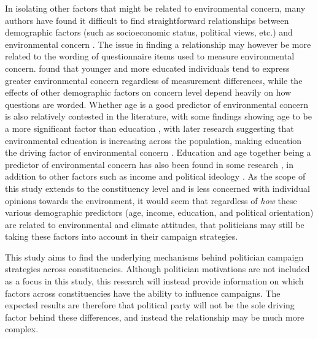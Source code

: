 \documentclass[12pt,letterpaper]{article}
\begin{document}
In isolating other factors that might be related to environmental concern, many authors have found it difficult to find straightforward relationships between demographic factors (such as socioeconomic status, political views, etc.) and environmental concern \autocite{dietzSocialStructuralSocial1998,samdahlSocialDeterminantsEnvironmental1989,giffordPersonalSocialFactors2014}. The issue in finding a relationship may however be more related to the wording of questionnaire items used to measure environmental concern. \textcite{klinebergDemographicPredictorsEnvironmental1998} found that younger and more educated individuals tend to express greater environmental concern regardless of measurement differences, while the effects of other demographic factors on concern level depend heavily on how questions are worded. Whether age is a good predictor of environmental concern is also relatively contested in the literature, with some findings showing age to be a more significant factor than education \autocite{buttelAgeEnvironmentalConcern1979}, with later research suggesting that environmental education is increasing across the population, making education the driving factor of environmental concern \autocite{howellChangingFaceEnvironmental1992}. Education and age together being a predictor of environmental concern has also been found in some research \autocite{arcuryEnvironmentalWorldviewResponse1990}, in addition to other factors such as income \autocite{gambaFactorsInfluencingCommunity1994} and political ideology \autocite{dunlapImpactPoliticalOrientation1975}. As the scope of this study extends to the constituency level and is less concerned with individual opinions towards the environment, it would seem that regardless of \textit{how} these various demographic predictors (age, income, education, and political orientation) are related to environmental and climate attitudes, that politicians may still be taking these factors into account in their campaign strategies.

This study aims to find the underlying mechanisms behind politician campaign strategies across constituencies. Although politician motivations are not included as a focus in this study, this research will instead provide information on which factors across constituencies have the ability to influence campaigns. The expected results are therefore that political party will not be the sole driving factor behind these differences, and instead the relationship may be much more complex. 
	
	
	\newpage
	
\end{document}
